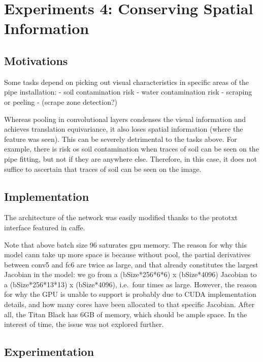 \documentclass[a4paper,11pt]{article}
\begin{document}
\section{Experiments 4: Conserving Spatial Information}

\subsection{Motivations}

Some tasks depend on picking out visual characteristics in specific areas of the pipe installation:
- soil contamination risk
- water contamination risk
- scraping or peeling
- (scrape zone detection?)

Whereas pooling in convolutional layers condenses the visual information and achieves translation equivariance, it also loses spatial information (where the feature was seen). This can be severely detrimental to the tasks above. For example, there is risk os soil contamination when traces of soil can be seen on the pipe fitting, but not if they are anywhere else. Therefore, in this case, it does not suffice to ascertain that traces of soil can be seen on the image. \\

\subsection{Implementation}

The architecture of the network was easily modified thanks to the prototxt interface featured in caffe. 

Note that above batch size 96 saturates gpu memory. The reason for why this model cann take up more space is because without pool, the partial derivatives between conv5 and fc6 are twice as large, and that already constitutes the largest Jacobian in the model: we go from a (bSize*256*6*6) x (bSize*4096) Jacobian to a (bSize*256*13*13) x (bSize*4096), i.e.\ four times as large. However, the reason for why the GPU is unable to support is probably due to CUDA implementation details, and how many cores have been allocated to that specific Jacobian. After all, the Titan Black has 6GB of memory, which should be ample space. In the interest of time, the issue was not explored further. 

\subsection{Experimentation}
\end{document}
